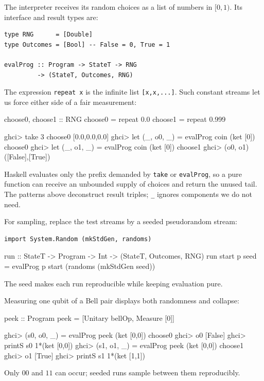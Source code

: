 \documentclass[11pt,a4paper]{article}
\theoremstyle{definition}
\begin{document}
The interpreter receives its random choices as a list of numbers in $[0,1)$.
Its interface and result types are:
\begin{lstlisting}
type RNG      = [Double]
type Outcomes = [Bool] -- False = 0, True = 1

evalProg :: Program -> StateT -> RNG
         -> (StateT, Outcomes, RNG)
\end{lstlisting}
The expression \lstinline|repeat x| is the infinite list
\lstinline|[x,x,...]|.  Such constant streams let us force either side of a
fair measurement:
\begin{qppcode}
choose0, choose1 :: RNG
choose0 = repeat 0.0
choose1 = repeat 0.999

ghci> take 3 choose0
[0.0,0.0,0.0]
ghci> let (_, o0, _) = evalProg coin (ket [0]) choose0
ghci> let (_, o1, _) = evalProg coin (ket [0]) choose1
ghci> (o0, o1)
([False],[True])
\end{qppcode}
Haskell evaluates only the prefix demanded by \lstinline|take| or
\lstinline|evalProg|, so a
pure function can receive an unbounded supply of choices and return the unused
tail.  The patterns above deconstruct result triples; \lstinline|_| ignores
components we do not need.

For sampling, replace the test streams by a seeded pseudorandom stream:
\begin{lstlisting}
import System.Random (mkStdGen, randoms)
\end{lstlisting}
\begin{qppcode}
run :: StateT -> Program -> Int -> (StateT, Outcomes, RNG)
run start p seed = evalProg p start (randoms (mkStdGen seed))
\end{qppcode}
The seed makes each run reproducible while keeping evaluation pure.

Measuring one qubit of a Bell pair displays both randomness and collapse:
\begin{qppcode}
peek :: Program
peek = [Unitary bellOp, Measure [0]]

ghci> (s0, o0, _) = evalProg peek (ket [0,0]) choose0
ghci> o0
[False]
ghci> printS s0
1*(ket [0,0])
ghci> (s1, o1, _) = evalProg peek (ket [0,0]) choose1
ghci> o1
[True]
ghci> printS s1
1*(ket [1,1])
\end{qppcode}
Only $00$ and $11$ can occur; seeded runs sample between them reproducibly.
\end{document}
